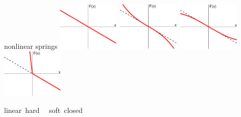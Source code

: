 \documentclass[urlcolor=blue,dvipsnames]{beamer}
\begin{document}
\begin{frame}{nonlinear springs}
\mbox{\includegraphics[width=0.22\textwidth]{figs/spring-linear} \quad
\includegraphics[width=0.22\textwidth]{figs/spring-hard} \quad
\includegraphics[width=0.22\textwidth]{figs/spring-soft} \quad
\includegraphics[width=0.22\textwidth]{figs/spring-closed}}

\mbox{\qquad linear \qquad\qquad\quad hard \qquad\qquad\quad\,\, soft \qquad\qquad\quad closed}
\end{frame}
\end{document}
